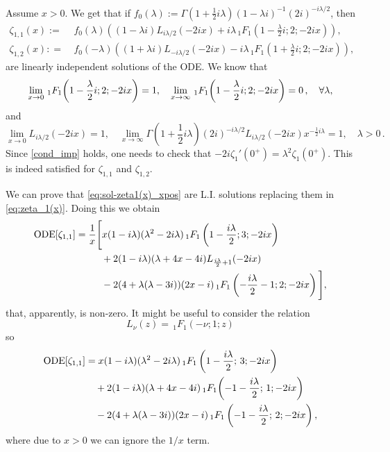 \documentclass[%
 aip,
 jmp,%
 amsmath,amssymb,
 reprint,%
]{revtex4-2}
\begin{document}
Assume $x>0$. We get that if $f_0(\lambda):= \Gamma(1+\frac12i\lambda)  (1-\lambda i)^{-1}(2i)^{-i\lambda/2}$, then
\begin{equation}\label{eq:sol-zeta1(x)_xpos}
\begin{aligned}
\zeta_{1,1}(x) := &~{} f_0(\lambda) \left(  (1-\lambda i)  L_{i \lambda/2}(-2 i x)+ i \lambda \, _1F_1\left(1- \frac{\lambda}2 i ;2;-2 i x \right) \right),\\
\zeta_{1,2}(x) : =  &~{}  f_0(-\lambda) \left( (1+ \lambda i)L_{-i \lambda/2}(-2 i x) -i \lambda \, _1F_1\left(1+  \frac{\lambda}2i ;2;-2 i x \right)\right),
\end{aligned}
\end{equation}
are linearly independent solutions of the ODE. We know that
\begin{equation*}
    \lim_{x\to 0}\,_1F_1\qty(1-\frac{\lambda}{2}i;2;-2ix)=1, \quad  \lim_{x\to\infty}\,_1F_1\qty(1-\frac{\lambda}{2}i;2;-2ix)=0\,, \quad \forall \lambda,
\end{equation*}
and
\begin{equation*}
    \lim_{x\to 0}L_{i\lambda/2}(-2ix)=1,\quad   \lim_{x\to\infty} \Gamma \left( 1+\frac12i\lambda \right) (2i)^{-i\lambda/2} L_{i\lambda/2}(-2ix) x^{-\frac12i\lambda}=1,\quad \lambda>0\,.
\end{equation*}
Since \eqref{cond_imp} holds, one needs to check that $-2i \zeta_1'(0^+) = \lambda^2 \zeta_1(0^+)$. This is indeed satisfied for $\zeta_{1,1}$ and $\zeta_{1,2}$.

We can prove that \eqref{eq:sol-zeta1(x)_xpos} are L.I. solutions replacing them in \eqref{eq:zeta_1(x)}. Doing this we obtain
\begin{equation}
\begin{aligned}
    \text{ODE}\qty[\zeta_{1,1}] &= \frac{1}{x}\Bigg[ x(1-i \lambda )(\lambda^2 -2 i\lambda)\, _1F_1\left(1-\frac{i \lambda }{2};3;-2 i x\right)\\
    &\qquad\:\:\: +2 (1-i \lambda )(\lambda +4 x-4 i) L_{\frac{i \lambda }{2}+1}(-2 i x)\\
    &\qquad\:\:\: -2 (4+\lambda  (\lambda -3 i)) (2 x-i) \, _1F_1\left(-\frac{i \lambda }{2}-1;2;-2 i x\right)\Bigg],
\end{aligned}
\end{equation}
that, apparently, is non-zero. It might be useful to consider the relation
\begin{equation*}
L_\nu (z) = \,_1F_1(-\nu;1;z)
\end{equation*}
so
\begin{equation}\label{eq:ODE[zeta_11]}
\begin{aligned}
    \text{ODE}\qty[\zeta_{1,1}] &= x(1-i \lambda )(\lambda^2 -2 i\lambda)\, _1F_1\left(1-\frac{i \lambda }{2};\,3;-2 i x\right)\\
    &\quad +2 (1-i \lambda )(\lambda +4 x-4 i) \,_1F_1\qty(-1 - \frac{i\lambda}{2};\,1;-2ix)\\
    &\quad -2 (4+\lambda  (\lambda -3 i)) (2 x-i) \, _1F_1\left(-1 - \frac{i \lambda }{2};\,2;-2 i x\right),
\end{aligned}
\end{equation}
where due to $x>0$ we can ignore the $1/x$ term.
\end{document}
